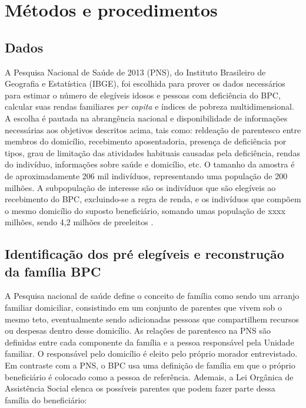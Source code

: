 \documentclass[
	12pt,				%
	openright,			%
	twoside,			%
	a4paper,			%
	english,			%
	french,				%
	spanish,			%
	brazil				%
	]{abntex2}
\begin{document}

\chapter{Métodos e procedimentos}
	\section{Dados}
	A Pesquisa Nacional de Saúde de 2013 (PNS), do Instituto Brasileiro de Geografia e Estatística (IBGE), foi escolhida para prover os dados necessários para estimar o número de elegíveis idosos e pessoas com deficiência do BPC, calcular suas rendas familiares \textit{per capita} e índices de pobreza multidimensional. A escolha é pautada na abrangência nacional e disponibilidade de informações necessárias aos objetivos descritos acima, tais como: reldeação de parentesco entre membros do domicílio, recebimento  aposentadoria, presença de deficiência por tipos, grau de limitação das atividades habituais causadas pela deficiência, rendas do indivíduo, informações sobre saúde e domicílio, etc.   
	O tamanho da amostra é de aproximadamente 206 mil indivíduos, representando uma população de 200 milhões. A subpopulação de interesse são os indivíduos que são elegíveis ao recebimento do BPC, excluindo-se a regra de renda, e os indivíduos que compõem o mesmo domicílio do suposto beneficiário, somando umas população de xxxx milhões, sendo 4,2 milhões de preeleitos .
	
	\section{Identificação dos pré elegíveis e reconstrução da família BPC}
	
	A Pesquisa nacional de saúde define o conceito de família como sendo um arranjo familiar domiciliar, consistindo em um conjunto de parentes que vivem sob o mesmo teto, eventualmente sendo adicionadas pessoas que compartilhem recursos ou despesas dentro desse domicílio. As relações de parentesco na PNS são definidas entre cada componente da família e a pessoa responsável pela Unidade familiar. O responsável pelo domicílio é eleito pelo próprio morador entrevistado. Em contraste com a PNS, o BPC usa uma definição de família em que o próprio beneficiário é colocado como a pessoa de referência. Ademais, a Lei Orgânica de Assistência Social elenca os possíveis parentes que podem fazer parte dessa família do beneficiário:
	
\end{document}

